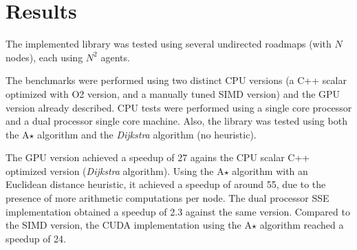 \section{Results}

The implemented library was tested using several undirected roadmaps (with $N$ nodes), each using $N^2$ agents.

The benchmarks were performed using two distinct CPU versions (a C++ scalar optimized with O2 version, and a manually tuned SIMD version) and the GPU version already described. CPU tests were performed using a single core processor and a dual processor single core machine. Also, the library was tested using both the A$\star$ algorithm and the \textit{Dijkstra} algorithm (no heuristic).

The GPU version achieved a speedup of 27 agains the CPU scalar C++ optimized version (\textit{Dijkstra} algorithm). Using the A$\star$ algorithm with an Euclidean distance heuristic, it achieved a speedup of around 55, due to the presence of more arithmetic computations per node. The dual processor SSE implementation obtained a speedup of 2.3 against the same version. Compared to the SIMD version, the CUDA implementation using the A$\star$ algorithm reached a speedup of 24.